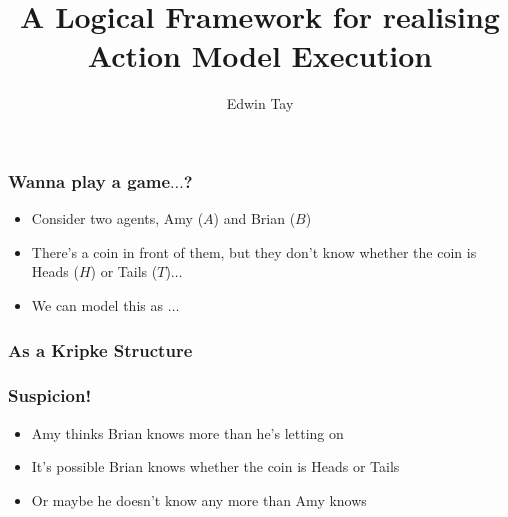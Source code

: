 \documentclass{beamer}
\begin{document}
\title{A Logical Framework for realising Action Model Execution}
\author{Edwin Tay}

\begin{comment}
My honours presentation.
Need to discuss project and give a motivating idea.
In general:

given an epistemic goal we can find an action model we can construct an
action model

given an epistemic action model how can we realise it

do no maths, use pictures

don’t say “this is too complicated” - don’t
mention the “too complicated stuff”!
\end{comment}

\frame{\titlepage}

\begin{frame}
\frametitle{Wanna play a game$\ldots$?}
\begin{itemize}
  \item Consider two agents, Amy ($A$) and Brian ($B$)
  \item There's a coin in front of them, but they don't know whether the coin is
    Heads ($H$) or Tails ($T$)$\ldots$
  \item We can model this as $\ldots$
\end{itemize}
\end{frame}

\begin{frame}
\frametitle{As a Kripke Structure}
\begin{figure}
\end{figure}
\end{frame}

\begin{frame}
\frametitle{Suspicion!}
\begin{itemize}
  \item Amy thinks Brian knows more than he's letting on
  \item It's possible Brian knows whether the coin is Heads or Tails
  \item Or maybe he doesn't know any more than Amy knows
\end{itemize}
\end{frame}
\end{document}
